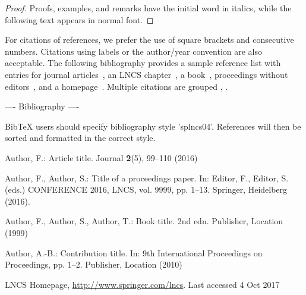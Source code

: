 \documentclass[runningheads]{llncs}
\begin{document}
\begin{proof}
Proofs, examples, and remarks have the initial word in italics,
while the following text appears in normal font.
\end{proof}
For citations of references, we prefer the use of square brackets
and consecutive numbers. Citations using labels or the author/year
convention are also acceptable. The following bibliography provides
a sample reference list with entries for journal
articles~\cite{ref_article1}, an LNCS chapter~\cite{ref_lncs1}, a
book~\cite{ref_book1}, proceedings without editors~\cite{ref_proc1},
and a homepage~\cite{ref_url1}. Multiple citations are grouped
\cite{ref_article1,ref_lncs1,ref_book1},
\cite{ref_article1,ref_book1,ref_proc1,ref_url1}.

---- Bibliography ----

BibTeX users should specify bibliography style 'splncs04'.
References will then be sorted and formatted in the correct style.




\begin{thebibliography}{8}
Author, F.: Article title. Journal \textbf{2}(5), 99--110 (2016)

Author, F., Author, S.: Title of a proceedings paper. In: Editor,
F., Editor, S. (eds.) CONFERENCE 2016, LNCS, vol. 9999, pp. 1--13.
Springer, Heidelberg (2016). 

Author, F., Author, S., Author, T.: Book title. 2nd edn. Publisher,
Location (1999)

Author, A.-B.: Contribution title. In: 9th International Proceedings
on Proceedings, pp. 1--2. Publisher, Location (2010)

LNCS Homepage, \url{http://www.springer.com/lncs}. Last accessed 4
Oct 2017
\end{thebibliography}
\end{document}
